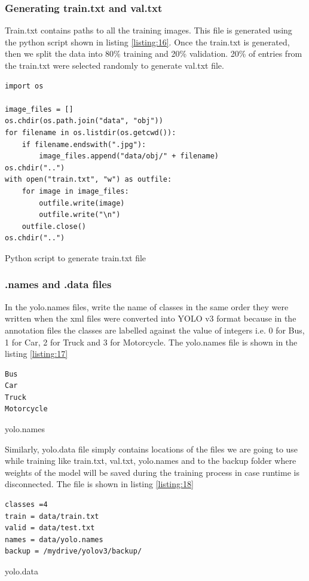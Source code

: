 \subsubsection{Generating train.txt and val.txt}
Train.txt contains paths to all the training images. This file is generated using the python script shown in listing \ref{listing:16}. Once the train.txt is generated, then we split the data into 80\% training and 20\% validation.
20\% of entries from the train.txt were selected randomly to generate val.txt file.
\begin{longlisting}
\begin{verbatim}
import os

image_files = []
os.chdir(os.path.join("data", "obj"))
for filename in os.listdir(os.getcwd()):
    if filename.endswith(".jpg"):
        image_files.append("data/obj/" + filename)
os.chdir("..")
with open("train.txt", "w") as outfile:
    for image in image_files:
        outfile.write(image)
        outfile.write("\n")
    outfile.close()
os.chdir("..")
\end{verbatim}
\caption{Python script to generate train.txt file}
\label{listing:16}
\end{longlisting}
\subsubsection{.names and .data files}
In the yolo.names files, write the name of classes in the same order they were written when the xml files were converted into YOLO v3 format because in the annotation files the classes are labelled against the value of integers i.e. 0 for Bus, 1 for Car, 2 for Truck and 3 for Motorcycle. The yolo.names file is shown in the listing \ref{listing:17}
\begin{longlisting}
\begin{verbatim}
Bus
Car
Truck 
Motorcycle
\end{verbatim}
\caption{yolo.names}
\label{listing:17}
\end{longlisting}
Similarly, yolo.data file simply contains locations of the files we are going to use while training like train.txt, val.txt, yolo.names and to the backup folder where weights of the model will be saved during the training process in case runtime is disconnected. The file is shown in listing \ref{listing:18}
\begin{longlisting}
\begin{verbatim}
classes =4
train = data/train.txt
valid = data/test.txt
names = data/yolo.names 
backup = /mydrive/yolov3/backup/
\end{verbatim}
\caption{yolo.data}
\label{listing:18}
\end{longlisting}

